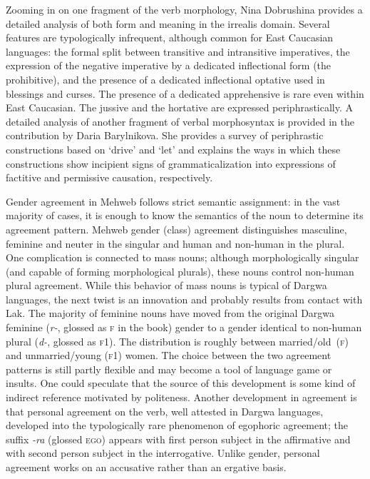 \begin{refsection}
Zooming in on one fragment of the verb morphology, Nina Dobrushina
provides a detailed analysis of both form and meaning in the irrealis
domain. Several features are typologically infrequent, although common
for East Caucasian languages: the formal split between transitive and
intransitive imperatives, the expression of the negative imperative by a
dedicated inflectional form (the prohibitive), and the presence of a dedicated
inflectional optative used in blessings and curses. The presence of a
dedicated apprehensive is rare even within East Caucasian. The jussive
and the hortative are expressed periphrastically. A detailed analysis of
another fragment of verbal morphosyntax is provided in the contribution by Daria
Barylnikova. She provides a survey of periphrastic constructions based
on `drive' and `let' and explains the ways in which these constructions
show incipient signs of grammaticalization into expressions of factitive and permissive
causation, respectively.

Gender agreement in Mehweb follows strict semantic assignment:
in the vast majority of cases, it is enough to know the semantics of the
noun to determine its agreement pattern. Mehweb gender (class) agreement
distinguishes masculine, feminine and neuter in the singular and human
and non-human in the plural. One complication is connected to mass
nouns; although morphologically singular (and capable of forming
morphological plurals), these nouns control non-human plural agreement.
While this behavior of mass nouns is typical of Dargwa languages, the
next twist is an innovation and probably results from contact with Lak.
The majority of feminine nouns have moved from the original Dargwa
feminine (\emph{r-}, glossed as \textsc{f} in the book) gender to a gender
identical to non-human plural (\emph{d-}, glossed as \textsc{f1}). The
distribution is roughly between married/old~(\textsc{f}) and unmarried/young (\textsc{f1})
women. The choice between the two agreement patterns is still partly
flexible and may become a tool of language game or insults. One could
speculate that the source of this development is some kind of indirect
reference motivated by politeness. Another development in agreement is
that personal agreement on the verb, well attested in Dargwa languages,
developed into the typologically rare phenomenon of egophoric agreement;
the suffix \emph{-ra} (glossed \textsc{ego}) appears with first
person subject in the affirmative and with second person subject in
the interrogative. Unlike gender, personal agreement works on
an accusative rather than an  ergative basis.


\end{refsection}
